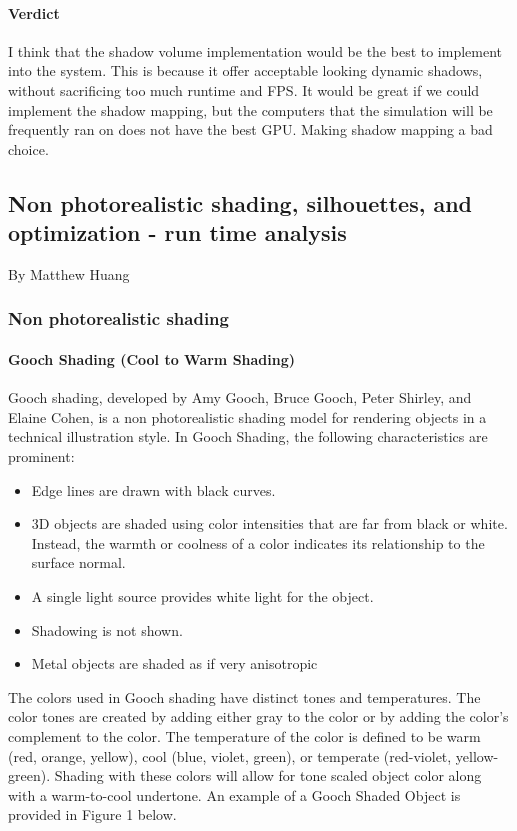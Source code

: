 \paragraph{Verdict}
I think that the shadow volume implementation would be the best to implement into the system.
This is because it offer acceptable looking dynamic shadows, without sacrificing too much runtime and FPS.
It would be great if we could implement the shadow mapping, but the computers that the simulation will be frequently ran on does not have the best GPU.
Making shadow mapping a bad choice.

\newpage

\subsection{Non photorealistic shading, silhouettes, and optimization - run time analysis}
\large{By Matthew Huang}
\normalsize
\subsubsection{Non photorealistic shading}

\paragraph{Gooch Shading (Cool to Warm Shading)}
Gooch shading, developed by Amy Gooch, Bruce Gooch, Peter Shirley, and Elaine Cohen, is a non photorealistic shading model for rendering objects in a technical illustration style. \cite{gooch}
In Gooch Shading, the following characteristics are prominent:
\begin{itemize}
\item Edge lines are drawn with black curves.
\item 3D objects are shaded using color intensities that are far from black or white. Instead, the warmth or coolness of a color indicates its relationship to the surface normal.
\item A single light source provides white light for the object.
\item Shadowing is not shown.
\item Metal objects are shaded as if very anisotropic
\end{itemize}
The colors used in Gooch shading have distinct tones and temperatures.
The color tones are created by adding either gray to the color or by adding the color's complement to the color. The temperature of the color is defined to be warm (red, orange, yellow), cool (blue, violet, green), or temperate (red-violet, yellow-green). Shading with these colors will allow for tone scaled object color along with a warm-to-cool undertone. An example of a Gooch Shaded Object is provided in Figure 1 below. \cite{gooch2}

